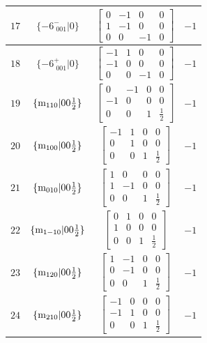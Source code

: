 \documentclass[fleqn,8pt]{jsarticle}
\begin{document}
\begin{longtable}{cccc}
$ 17 $ & $ \{-6^{-}_{\,\,001}|0\} $ & $ \begin{bmatrix} 0 & -1 & 0 & 0 \\ 1 & -1 & 0 & 0 \\ 0 & 0 & -1 & 0 \end{bmatrix} $ & $ -1 $ \\ \hline
$ 18 $ & $ \{-6^{+}_{\,\,001}|0\} $ & $ \begin{bmatrix} -1 & 1 & 0 & 0 \\ -1 & 0 & 0 & 0 \\ 0 & 0 & -1 & 0 \end{bmatrix} $ & $ -1 $ \\ \hline
$ 19 $ & $ \{{\rm m}_{110}|0 0 \frac{1}{2}\} $ & $ \begin{bmatrix} 0 & -1 & 0 & 0 \\ -1 & 0 & 0 & 0 \\ 0 & 0 & 1 & \frac{1}{2} \end{bmatrix} $ & $ -1 $ \\ \hline
$ 20 $ & $ \{{\rm m}_{100}|0 0 \frac{1}{2}\} $ & $ \begin{bmatrix} -1 & 1 & 0 & 0 \\ 0 & 1 & 0 & 0 \\ 0 & 0 & 1 & \frac{1}{2} \end{bmatrix} $ & $ -1 $ \\ \hline
$ 21 $ & $ \{{\rm m}_{010}|0 0 \frac{1}{2}\} $ & $ \begin{bmatrix} 1 & 0 & 0 & 0 \\ 1 & -1 & 0 & 0 \\ 0 & 0 & 1 & \frac{1}{2} \end{bmatrix} $ & $ -1 $ \\ \hline
$ 22 $ & $ \{{\rm m}_{1-10}|0 0 \frac{1}{2}\} $ & $ \begin{bmatrix} 0 & 1 & 0 & 0 \\ 1 & 0 & 0 & 0 \\ 0 & 0 & 1 & \frac{1}{2} \end{bmatrix} $ & $ -1 $ \\ \hline
$ 23 $ & $ \{{\rm m}_{120}|0 0 \frac{1}{2}\} $ & $ \begin{bmatrix} 1 & -1 & 0 & 0 \\ 0 & -1 & 0 & 0 \\ 0 & 0 & 1 & \frac{1}{2} \end{bmatrix} $ & $ -1 $ \\ \hline
$ 24 $ & $ \{{\rm m}_{210}|0 0 \frac{1}{2}\} $ & $ \begin{bmatrix} -1 & 0 & 0 & 0 \\ -1 & 1 & 0 & 0 \\ 0 & 0 & 1 & \frac{1}{2} \end{bmatrix} $ & $ -1 $ \\
\end{longtable}
\end{document}
